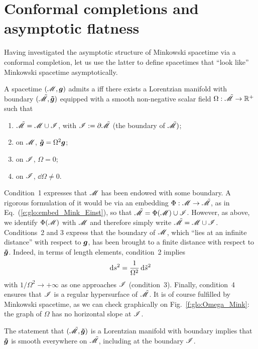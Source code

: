 \section{Conformal completions and asymptotic flatness} \label{s:glo:conf_compl}

Having investigated the asymptotic structure of Minkowski spacetime
via a conformal completion, let us use the latter to define spacetimes
that ``look like'' Minkowski spacetime asymptotically.
\begin{greybox}
A spacetime $(\mathscr{M},\bm{g})$ admits a
iff there exists a Lorentzian manifold with boundary
$(\tilde{\mathscr{M}},\bm{\tilde{g}})$ equipped with a smooth non-negative scalar field
$\Omega: \tilde{\mathscr{M}} \rightarrow \mathbb{R}^+$
such that
\begin{enumerate}
\item $\tilde{\mathscr{M}} = \mathscr{M} \cup \mathscr{I}$, with $\mathscr{I} := \partial \tilde{\mathscr{M}}$
(the boundary of $\tilde{\mathscr{M}})$;
\item on $\mathscr{M}$, $\bm{\tilde{g}} = \Omega^2 \bm{g}$;
\item on $\mathscr{I}$, $\Omega=0$;
\item on $\mathscr{I}$, $\dd \Omega \not= 0$.
\end{enumerate}
\end{greybox}
Condition~1 expresses that $\mathscr{M}$ has been endowed with some boundary.
A rigorous formulation of it would be via an embedding $\Phi:\mathscr{M} \rightarrow \tilde{\mathscr{M}}$,
as in Eq.~(\ref{e:glo:embed_Mink_Einst}), so that
$\tilde{\mathscr{M}} = \Phi(\mathscr{M}) \cup \mathscr{I}$. However, as above, we identify $\Phi(\mathscr{M})$
with $\mathscr{M}$ and therefore simply write $\tilde{\mathscr{M}} = \mathscr{M} \cup \mathscr{I}$.
Conditions~2 and 3 express that the boundary of $\mathscr{M}$, which ``lies at an infinite
distance'' with respect to $\bm{g}$, has been brought to a
finite distance with respect to $\bm{\tilde{g}}$. Indeed, in terms of
length elements, condition~2
implies
\[
    \mathrm{d} s^2 = \frac{1}{\Omega^2} \, \mathrm{d} {\tilde s}^2
\]
with $1/\Omega^2 \rightarrow +\infty$ as one approaches $\mathscr{I}$
(condition~3).
 Finally, condition~4 ensures
that $\mathscr{I}$ is a regular hypersurface of $\tilde{\mathscr{M}}$.
It is of course fulfilled by Minkowski spacetime, as we can check graphically
on Fig.~\ref{f:glo:Omega_Mink}: the graph of $\Omega$ has no horizontal slope
at $\mathscr{I}$.

\begin{remark}
The statement that $(\tilde{\mathscr{M}},\bm{\tilde{g}})$ is a Lorentzian manifold with
boundary implies that $\bm{\tilde{g}}$ is smooth everywhere on $\tilde{\mathscr{M}}$,
including at the boundary $\mathscr{I}$.
\end{remark}

